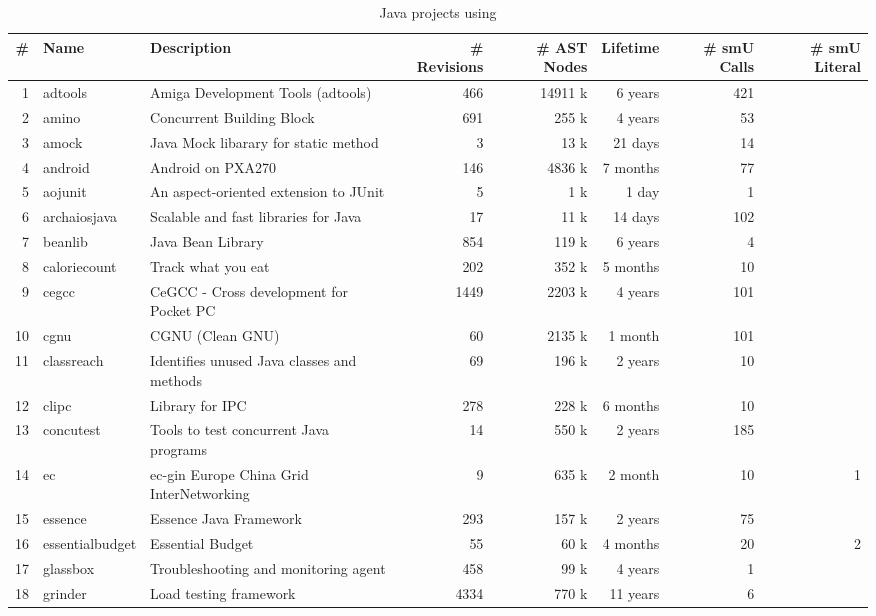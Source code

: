 
\begin{table*}[htb]
\centering
\caption{Java projects using \smu{}}  \label{table:projects}
\begin{tabularx}{\textwidth}{|r|l|X|r|r|r|r|r|} \hline    

 \# & Name & Description & \# Revisions & \# AST Nodes & Lifetime & \# smU Calls & \# smU Literal \\ \hline
  1 & adtools & Amiga Development Tools (adtools) & 466 & 14911 k & 6 years  & 421 & \\ 
  2 & amino & Concurrent Building Block & 691 & 255 k & 4 years  &  53 & \\ 
  3 & amock & Java Mock libarary for static method &   3 & 13 k &  21 days &  14 & \\ 
  4 & android & Android on PXA270   & 146 & 4836 k &  7 months  &  77 & \\ 
  5 & aojunit & An aspect-oriented extension to JUnit   &   5 & 1 k & 1 day &   1 & \\ 
  6 & archaiosjava & Scalable and fast libraries for Java  &  17 & 11 k &  14 days & 102 & \\ 
  7 & beanlib & Java Bean Library  & 854 & 119 k & 6 years  &   4 & \\ 
  8 & caloriecount & Track what you eat  & 202 & 352 k &  5 months &  10 & \\ 
  9 & cegcc & CeGCC - Cross development for Pocket PC  & 1449 & 2203 k & 4 years & 101 & \\ 
  10 & cgnu & CGNU (Clean GNU)  &  60 & 2135 k &  1 month & 101 & \\ 
  11 & classreach & Identifies unused Java classes and methods  &  69 & 196 k & 2 years & 10 & \\ 
  12 & clipc & Library for IPC  & 278 & 228 k &  6 months &  10 & \\ 
  13 & concutest & Tools to test concurrent Java programs & 14 & 550 k & 2 years  & 185 & \\ 
  14 & ec & ec-gin Europe China Grid InterNetworking    &   9 & 635 k &  2 month  &  10 & 1 \\ 
  15 & essence & Essence Java Framework    & 293 & 157 k & 2 years &  75 & \\ 
  16 & essentialbudget & Essential Budget   &  55 & 60 k &  4 months &  20 & 2 \\ 
  17 & glassbox & Troubleshooting and monitoring agent  & 458 & 99 k & 4 years &   1 & \\ 
  18 & grinder & Load testing framework  & 4334 & 770 k & 11 years  &   6 & \\ 

\end{tabularx}
\end{table*}
